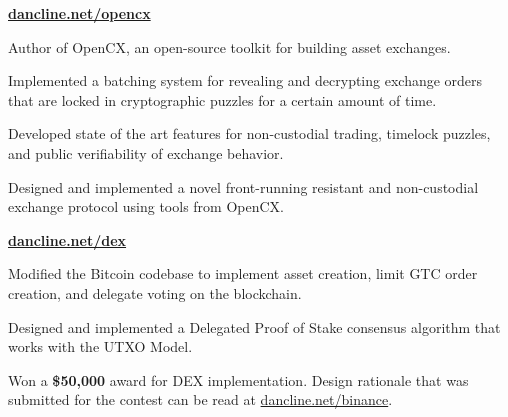 
\hfill \href{https://dancline.net/opencx}{\textbf{dancline.net/opencx}}
\begin{tightemize}
  \item Author of OpenCX, an open-source toolkit for building asset exchanges.
  \item Implemented a batching system for revealing and decrypting exchange orders that are locked in cryptographic puzzles for a certain amount of time.
  \item Developed state of the art features for non-custodial trading,
      timelock puzzles, and public verifiability of exchange behavior.
  \item Designed and implemented a novel front-running resistant and non-custodial exchange protocol using tools from OpenCX.
\end{tightemize}
\subsectionsep


\hfill \href{https://dancline.net/dex}{\textbf{dancline.net/dex}}
\begin{tightemize}
  \item Modified the Bitcoin codebase to implement asset creation, limit GTC
    order creation, and delegate voting on the blockchain.
  \item Designed and implemented a Delegated Proof of
      Stake consensus algorithm that works with the UTXO Model.
  \item Won a \textbf{\$50,000} award for DEX implementation.  Design rationale
      that was submitted for the contest can be read at
      \href{https://dancline.net/binance/}{dancline.net/binance}.
\end{tightemize}
